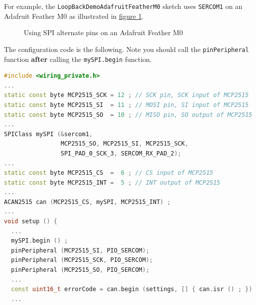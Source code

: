 \documentclass[10pt, a4paper, obeyspaces]{extarticle}
\newcommand\labelFigure[1]{\label{fig:#1}}
\newcommand\refFigure[2]{\hyperref[fig:#2]{figure \ref*{fig:#2}{\ifthenelse{\equal{#1}{}}{}{.#1}}}}
\begin{document}
For example, the \texttt{LoopBackDemoAdafruitFeatherM0} sketch uses \texttt{SERCOM1} on an Adafruit Feather M0 as illustrated in \refFigure{}{figureAdafruitFeatherM0AlternatePins}.
\begin{figure}[!ht]
  \small
  \centering
  \caption{Using SPI alternate pins on an Adafruit Feather M0}
  \labelFigure{figureAdafruitFeatherM0AlternatePins}
\end{figure}

The configuration code is the following. Note you should call the \texttt{pinPeripheral} function \textbf{after} calling the \texttt{mySPI.begin} function.
{ \small\begin{lstlisting}[language=c++]
#include <wiring_private.h>
...
static const byte MCP2515_SCK = 12 ; // SCK pin, SCK input of MCP2515 
static const byte MCP2515_SI  = 11 ; // MOSI pin, SI input of MCP2515  
static const byte MCP2515_SO  = 10 ; // MISO pin, SO output of MCP2515 
...
SPIClass mySPI (&sercom1,
                MCP2515_SO, MCP2515_SI, MCP2515_SCK,
                SPI_PAD_0_SCK_3, SERCOM_RX_PAD_2);
...
static const byte MCP2515_CS  =  6 ; // CS input of MCP2515 
static const byte MCP2515_INT =  5 ; // INT output of MCP2515
...
ACAN2515 can (MCP2515_CS, mySPI, MCP2515_INT) ;
...
void setup () {
  ...
  mySPI.begin () ;
  pinPeripheral (MCP2515_SI, PIO_SERCOM);
  pinPeripheral (MCP2515_SCK, PIO_SERCOM);
  pinPeripheral (MCP2515_SO, PIO_SERCOM);
  ...
  const uint16_t errorCode = can.begin (settings, [] { can.isr () ; }) ;
  ...
\end{lstlisting}}
\end{document}
